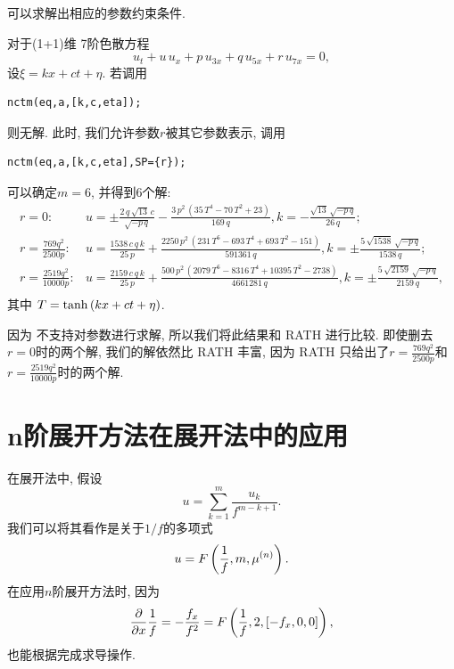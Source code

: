 \begin{example}可以求解出相应的参数约束条件. 

对于(1+1)维 7阶色散方程\cite{duffy1996travelling}
\begin{equation}
    {{u}_{t}}+u\,{{u}_{x}}+p\,{{u}_{3x}}+q\,{{u}_{5x}}+r\,{{u}_{7x}}=0,
\end{equation}
设$\xi=kx+ct+\eta$. 若调用
\begin{verbatim}
nctm(eq,a,[k,c,eta]);
\end{verbatim}
则无解. 此时, 我们允许参数$r$被其它参数表示, 调用
\begin{verbatim}
nctm(eq,a,[k,c,eta],SP={r});
\end{verbatim}
可以确定$m=6$, 并得到6个解:
\begin{equation}
\renewcommand{\arraystretch}{1.4}
\begin{array}{rl}
r=0:& u=\pm \frac{2\,q\,\sqrt {13}\,c}{\sqrt {-p\,q}}-\frac{3\,{p}^{2}\,\left( 35\,{T}^{4}-70\,{T}^{2}+23\right) }{169\,q},k=-\frac{\sqrt {13}\,\sqrt {-p\,q}}{26\,q};\\
r=\frac{769 q^2}{2500 p}:& u=\frac{1538\,c\,q\,k}{25\,p}+\frac{2250\,{p}^{2}\,\left( 231\,{T}^{6}-693\,{T}^{4}+693\,{T}^{2}-151\right) }{591361\,q},k=\pm \frac{5\,\sqrt {1538}\,\sqrt {-p\,q}}{1538\,q};\\
r=\frac{2519 q^2}{10000 p}:& u=\frac{2159\,c\,q\,k}{25\,p}+\frac{500\,{p}^{2}\,\left( 2079\,{T}^{6}-8316\,{T}^{4}+10395\,{T}^{2}-2738\right) }{4661281\,q},k=\pm\frac{5\,\sqrt {2159}\,\sqrt {-p\,q}}{2159\,q}, \\
\end{array}
\end{equation}
其中 $T=\tanh\left(kx+ct+\eta\right)$. 

因为 不支持对参数进行求解, 所以我们将此结果和 RATH 进行比较. 即使删去$r=0$时的两个解, 我们的解依然比 RATH\cite[p21]{liu2001master} 丰富, 因为 RATH 只给出了$r=\frac{769 q^2}{2500 p}$和$r=\frac{2519 q^2}{10000 p}$时的两个解. 
\end{example}

\section{n阶展开方法在\Painleve{}展开法中的应用}\label{ch4sec6}
在\Painleve{}展开法中, 假设 
\begin{equation}
    u=\sum_{k=1}^{m}\frac{u_k}{f^{m-k+1}}. \label{TPE-pkg}
\end{equation}
我们可以将其看作是关于$1/f$的多项式
\begin{equation}
    u=F\left(\frac{1}{f},m,\mu^{(n)}\right).
\end{equation}
在应用$n$阶展开方法时, 因为 
\begin{equation}
    \frac{\partial}{\partial x}{\frac{1}{f}}=-\frac{f_x}{f^2}=F\left(\frac{1}{f},2,\left[-f_x,0,0\right]\right),
\end{equation}
也能根据完成求导操作. 


